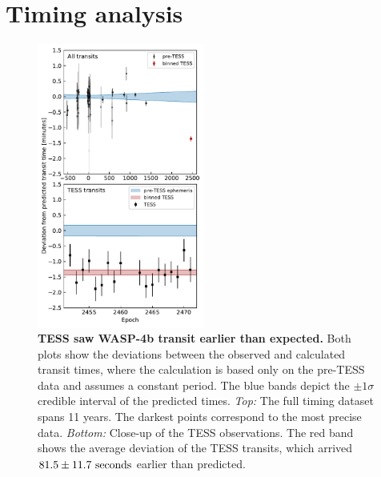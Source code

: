 \documentclass[12pt,twocolumn,tighten]{aastex62}
\begin{document}
\section{Timing analysis}
\label{sec:timing}

\begin{figure}[t]
    \begin{center}
        \leavevmode
        \includegraphics[width=0.49\textwidth]{f3.pdf}
    \end{center}
    \vspace{-0.6cm}
    \caption{ {\bf TESS saw WASP-4b transit earlier than expected.}
      Both plots show the deviations between the observed and
      calculated transit times, where the calculation is based only on
      the pre-TESS data and assumes a constant period.  The blue bands
      depict the $\pm$$1\sigma$ credible interval of the predicted
      times.  {\it Top:} The full timing dataset spans 11 years. The
      darkest points correspond to the most precise data.  {\it
        Bottom:} Close-up of the TESS observations. The red band shows
      the average deviation of the TESS transits, which arrived $81.5 \pm
      11.7\ {\rm seconds}$ earlier than predicted.
        \label{fig:arrived_early}
    }
\end{figure}
\end{document}
